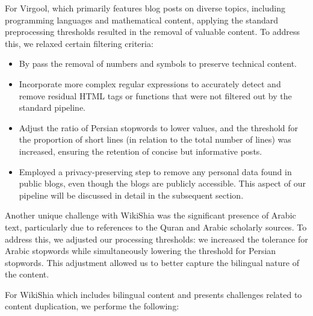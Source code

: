 For Virgool, which primarily features blog posts on diverse topics, including programming languages and mathematical content, applying the standard preprocessing thresholds resulted in the removal of valuable content. To address this, we relaxed certain filtering criteria: 
\begin{itemize}
    \item By pass the removal of numbers and symbols to preserve technical content.
    \item Incorporate more complex regular expressions to accurately detect and remove residual HTML tags or functions that were not filtered out by the standard pipeline.
    \item Adjust the ratio of Persian stopwords to lower values, and the threshold for the proportion of short lines (in relation to the total number of lines) was increased, ensuring the retention of concise but informative posts.
    \item Employed a privacy-preserving step to remove any personal data found in public blogs, even though the blogs are publicly accessible. This aspect of our pipeline will be discussed in detail in the subsequent section.
\end{itemize}

Another unique challenge with WikiShia was the significant presence of Arabic text, particularly due to references to the Quran and Arabic scholarly sources. To address this, we adjusted our processing thresholds: we increased the tolerance for Arabic stopwords while simultaneously lowering the threshold for Persian stopwords. This adjustment allowed us to better capture the bilingual nature of the content.


For WikiShia which includes bilingual content and presents challenges related to content duplication, we performe the following:

